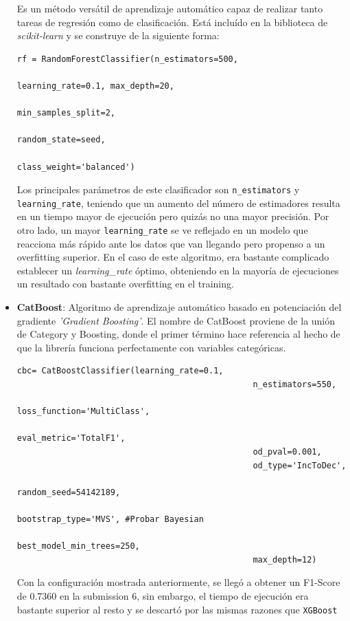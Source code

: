 \begin{itemize}
		Es un método versátil de aprendizaje automático capaz de realizar tanto tareas de regresión como de clasificación. Está incluído en la biblioteca de \textit{scikit-learn} y se construye de la siguiente forma: \\
		
		\begin{lstlisting}[frame=single]
rf = RandomForestClassifier(n_estimators=500, 
												    learning_rate=0.1, max_depth=20, 	
												    min_samples_split=2,
												    random_state=seed,
												    class_weight='balanced')	
		\end{lstlisting}
		
		
		
		Los principales parámetros de este clasificador son \texttt{n\_estimators} y \texttt{learning\_rate}, teniendo que un aumento del número de estimadores resulta en un tiempo mayor de ejecución pero quizás no una mayor precisión. Por otro lado, un mayor \texttt{learning\_rate} se ve reflejado en un modelo que reacciona más rápido ante los datos que van llegando pero  propenso a un overfitting superior. En el caso de este algoritmo, era bastante complicado establecer un \textit{learning\_rate} óptimo, obteniendo en la mayoría de ejecuciones un resultado con bastante overfitting en el training.
		
				
		\item \textbf{CatBoost}: Algoritmo de aprendizaje automático basado en potenciación del gradiente \textit{'Gradient Boosting'}. El nombre de CatBoost proviene de la unión de Category y Boosting, donde el primer término hace referencia al hecho de que la librería funciona perfectamente con variables categóricas. 
		
		
		\newpage
		\begin{lstlisting}[frame=single]
cbc= CatBoostClassifier(learning_rate=0.1,
												n_estimators=550,
												loss_function='MultiClass',
												eval_metric='TotalF1',
												od_pval=0.001,
												od_type='IncToDec',
												random_seed=54142189,
												bootstrap_type='MVS', #Probar Bayesian
												best_model_min_trees=250,
												max_depth=12)
		\end{lstlisting} 
		
		Con la configuración mostrada anteriormente, se llegó a obtener un F1-Score de 0.7360 en la submission 6, sin embargo, el tiempo de ejecución era bastante superior al resto y se descartó por las mismas razones que \texttt{XGBoost}
		

\end{itemize}
